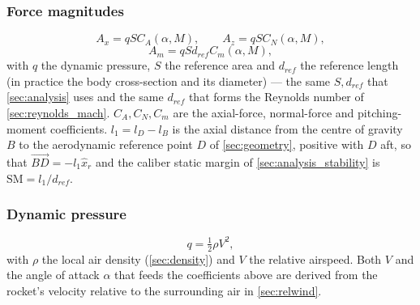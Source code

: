 \subsubsection{Force magnitudes}
\begin{equation}
    A_x = qSC_A(\alpha,M), \qquad A_z = qSC_N(\alpha,M),
\end{equation}
\begin{equation} \label{eq:aero_magnitudes}
    A_m = qSd_{ref}C_m(\alpha,M),
\end{equation}
with $q$ the dynamic pressure, $S$ the reference area and $d_{ref}$ the reference length (in
practice the body cross-section and its diameter) --- the same $S,d_{ref}$ that
\autoref{sec:analysis} uses and the same $d_{ref}$ that forms the Reynolds number of
\autoref{sec:reynolds_mach}. $C_A,C_N,C_m$ are the axial-force, normal-force and pitching-moment
coefficients. $l_1=l_D-l_B$ is the axial distance from the centre of gravity $B$ to the
aerodynamic reference point $D$ of \autoref{sec:geometry}, positive with $D$ aft, so that
$\vec{BD}=-l_1\hat{x}_r$ and the caliber static margin of \autoref{sec:analysis_stability} is
$\mathrm{SM}=l_1/d_{ref}$.

\subsubsection{Dynamic pressure}
\begin{equation}
    q = \tfrac12\rho V^2,
\end{equation}
with $\rho$ the local air density (\autoref{sec:density}) and $V$ the relative airspeed. Both $V$
and the angle of attack $\alpha$ that feeds the coefficients above are derived from the rocket's
velocity relative to the surrounding air in \autoref{sec:relwind}.

